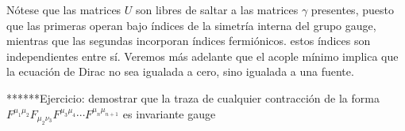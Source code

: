 Nótese que las matrices $U$ son libres de saltar a las matrices $\gamma$ presentes, puesto que las primeras operan bajo índices de la simetría interna del grupo gauge, mientras que las segundas incorporan índices fermiónicos. estos índices son independientes entre sí. Veremos más adelante que el acople mínimo implica que la ecuación de Dirac no sea igualada a cero, sino igualada a una fuente.

******Ejercicio: demostrar que la traza de cualquier contracción de la forma $F^{\mu_1 \mu_2} F_{\mu_2 \nu_3} F^{\mu_3 \mu_4} \cdots F^{\mu_{n} \mu_{n+1}}$ es invariante gauge